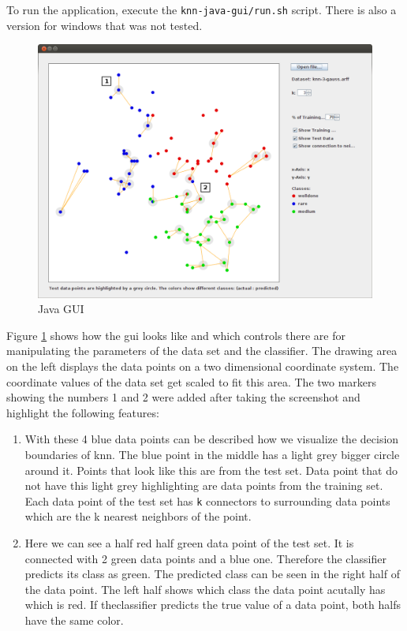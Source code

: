 \documentclass[paper=a4, fontsize=11pt]{scrartcl} %
\numberwithin{equation}{section} %
\numberwithin{figure}{section} %
\numberwithin{table}{section} %
\begin{document}
To run the application, execute the \texttt{knn-java-gui/run.sh} script. There is also a version for windows that was not tested.

\begin{figure}[\textwidth]
    \begin{center}
\includegraphics[width=\textwidth]{knn-visualization-marker}
    \end{center}
\caption{Java GUI}
\label{fig:javagui}
\end{figure}

Figure \ref{fig:javagui} shows how the gui looks like and which controls there are for manipulating the parameters of the data set and the classifier. The drawing area on the left displays the data points on a two dimensional coordinate system. The coordinate values of the data set get scaled to fit this area. The two markers showing the numbers 1 and 2 were added after taking the screenshot and highlight the following features:

\begin{enumerate}
\item With these 4 blue data points can be described how we visualize the decision boundaries of knn. The blue point in the middle has a light grey bigger circle around it. Points that look like this are from the test set. Data point that do not have this light grey highlighting are data points from the training set. Each data point of the test set has \texttt{k} connectors to surrounding data points which are the k nearest neighbors of the point.
\item Here we can see a half red half green data point of the test set. It is connected with 2 green data points and a blue one. Therefore the classifier predicts its class as green. The predicted class can be seen in the right half of the data point. The left half shows which class the data point acutally has which is red. If theclassifier predicts the true value of a data point, both halfs have the same color.
\end{enumerate}
\end{document}
